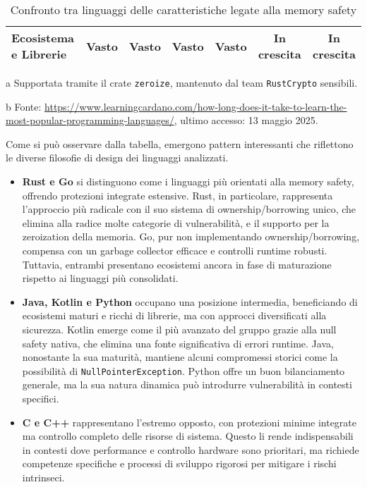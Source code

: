 \begin{table}[H]
\begin{threeparttable}
\begin{tabular}{l|c|c|c|c|c|c|}
      \textbf{Ecosistema e Librerie} & \cellcolor{green!20}Vasto     & \cellcolor{green!20}Vasto     & \cellcolor{green!20}Vasto     & \cellcolor{green!20}Vasto     & \cellcolor{yellow!20}In crescita & \cellcolor{yellow!20}In crescita \\
      \hline
    \end{tabular}
    \begin{tablenotes}
      \footnotesize \item[a] Supportata tramite il crate \texttt{zeroize}, mantenuto
      dal team \texttt{RustCrypto} sensibili. \item[b] Fonte:
      \url{https://www.learningcardano.com/how-long-does-it-take-to-learn-the-most-popular-programming-languages/},
      ultimo accesso: 13 maggio 2025.
    \end{tablenotes}
  \end{threeparttable}
  \caption{Confronto tra linguaggi delle caratteristiche legate alla memory
  safety}
  \label{tab:linguaggi_memory_safety}
\end{table}

\newpage
\noindent

Come si può osservare dalla tabella, emergono pattern interessanti che riflettono
le diverse filosofie di design dei linguaggi analizzati.

\begin{itemize}
  \item \textbf{Rust e Go} si distinguono come i linguaggi più orientati alla
    memory safety, offrendo protezioni integrate estensive. Rust, in particolare,
    rappresenta l'approccio più radicale con il suo sistema di ownership/borrowing
    unico, che elimina alla radice molte categorie di vulnerabilità, e il
    supporto per la zeroization della memoria. Go, pur non implementando
    ownership/borrowing, compensa con un garbage collector efficace e controlli runtime
    robusti. Tuttavia, entrambi presentano ecosistemi ancora in fase di maturazione
    rispetto ai linguaggi più consolidati.

  \item \textbf{Java, Kotlin e Python} occupano una posizione intermedia, beneficiando
    di ecosistemi maturi e ricchi di librerie, ma con approcci diversificati
    alla sicurezza. Kotlin emerge come il più avanzato del gruppo grazie alla null
    safety nativa, che elimina una fonte significativa di errori runtime. Java,
    nonostante la sua maturità, mantiene alcuni compromessi storici come la possibilità
    di \texttt{NullPointerException}. Python offre un buon bilanciamento generale,
    ma la sua natura dinamica può introdurre vulnerabilità in contesti specifici.

  \item \textbf{C e C++} rappresentano l'estremo opposto, con protezioni minime integrate
    ma controllo completo delle risorse di sistema. Questo li rende
    indispensabili in contesti dove performance e controllo hardware sono
    prioritari, ma richiede competenze specifiche e processi di sviluppo rigorosi
    per mitigare i rischi intrinseci.
\end{itemize}

